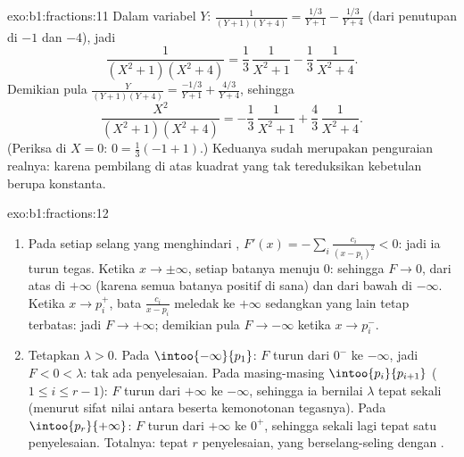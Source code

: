\begin{solution}{exo:b1:fractions:11}
Dalam variabel $Y$: $\frac1{(Y+1)(Y+4)} = \frac{1/3}{Y+1} -
\frac{1/3}{Y+4}$ (dari penutupan di $-1$ dan $-4$), jadi
\[
\frac{1}{(X^2+1)(X^2+4)}
= \frac13\,\frac1{X^2+1} - \frac13\,\frac1{X^2+4} .
\]
Demikian pula $\frac{Y}{(Y+1)(Y+4)} = \frac{-1/3}{Y+1} +
\frac{4/3}{Y+4}$, sehingga
\[
\frac{X^2}{(X^2+1)(X^2+4)}
= -\frac13\,\frac1{X^2+1} + \frac43\,\frac1{X^2+4} .
\]
(Periksa di $X = 0$: $0 = \frac13(-1 + 1)$.) Keduanya sudah merupakan
penguraian realnya: karena pembilang di atas kuadrat yang tak tereduksikan
kebetulan berupa konstanta.
\end{solution}

\begin{solution}{exo:b1:fractions:12}
\begin{enumerate}
  \item Pada setiap selang yang menghindari , $F'(x) = -\sum_i
        \frac{c_i}{(x - p_i)^2} < 0$: jadi ia turun tegas. Ketika $x
        \to \pm\infty$, setiap batanya menuju $0$: sehingga $F \to 0$, dari
        atas di $+\infty$ (karena semua batanya positif di sana) dan dari
        bawah di $-\infty$. Ketika $x \to p_i^+$, bata
        $\frac{c_i}{x - p_i}$ meledak ke $+\infty$ sedangkan yang lain
        tetap terbatas: jadi $F \to +\infty$; demikian pula $F \to -\infty$ ketika
        $x \to p_i^-$.
  \item Tetapkan $\lambda > 0$. Pada $\intoo{-\infty}{p_1}$: $F$
        turun dari $0^-$ ke $-\infty$, jadi $F < 0 < \lambda$:
        tak ada penyelesaian. Pada masing-masing $\intoo{p_i}{p_{i+1}}$ ($1 \leq i
        \leq r-1$): $F$ turun dari $+\infty$ ke $-\infty$,
        sehingga ia bernilai $\lambda$ tepat sekali (menurut sifat nilai
        antara beserta kemonotonan tegasnya). Pada
        $\intoo{p_r}{+\infty}$: $F$ turun dari $+\infty$ ke
        $0^+$, sehingga sekali lagi tepat satu penyelesaian. Totalnya: tepat $r$
        penyelesaian, yang berselang-seling dengan .
\end{enumerate}
\end{solution}


